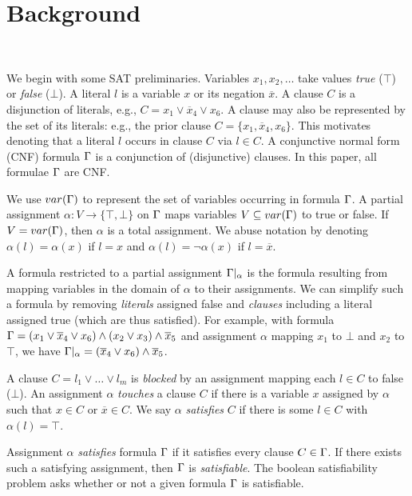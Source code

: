 \section{Background}~\label{sec:background}

We begin with some SAT preliminaries. Variables $x_1, x_2, \dots$ take values
\emph{true} ($\top$) or \emph{false} ($\bot$). A literal $l$ is a variable
$x$ or its negation $\overline{x}$. A clause $C$ is a disjunction of literals,
e.g., $C = x_1 \lor \overline{x}_4 \lor x_6$. A clause may also be represented by the set of its literals:
e.g., the prior clause $C = \{x_1, \overline{x}_4, x_6\}$. This motivates denoting that a literal
$l$ occurs in clause $C$ via $l \in C$. A conjunctive normal form (CNF)
formula $\Gamma$ is a conjunction of (disjunctive) clauses. In this paper,
all formulae $\Gamma$ are CNF.

We use $var(\Gamma)$ to represent the set of variables occurring in formula $\Gamma$.
A partial assignment $\alpha : V \rightarrow \{\top, \bot\}$ on $\Gamma$
maps variables $V \subseteq var(\Gamma)$ to true or false. If $V
= var(\Gamma)$, then $\alpha$ is a total assignment. We abuse notation by
denoting $\alpha(l) = \alpha(x)$ if $l = x$ and $\alpha(l) = \neg \alpha(x)$ if
$l = \overline{x}$.

A formula restricted to a partial assignment $\Gamma|_\alpha$ is the formula resulting from
mapping variables in the domain of $\alpha$ to their assignments. We can
simplify such a formula by removing \emph{literals} assigned false and
\emph{clauses} including a literal assigned true (which are thus satisfied).
For example, with formula $\Gamma =
(x_1 \lor \overline{x}_4 \lor x_6) \land (x_2 \lor x_3) \land \overline{x}_5$
and assignment $\alpha$ mapping $x_1$ to $\bot$ and $x_2$ to $\top$,
we have $\Gamma|_\alpha = (\overline{x}_4 \lor x_6) \land \overline{x}_5$.

A clause $C = l_1 \lor \dots \lor l_m$ is \emph{blocked} by an assignment
mapping each $l \in C$ to false ($\bot$). An assignment $\alpha$
\emph{touches} a clause $C$ if there is a variable $x$ assigned by $\alpha$
such that $x \in C$ or $\overline{x} \in C$. We say $\alpha$ \emph{satisfies}
$C$ if there is some $l \in C$ with $\alpha(l) = \top$.

Assignment $\alpha$ \emph{satisfies} formula $\Gamma$ if it satisfies every
clause $C \in \Gamma$. If there exists such a satisfying assignment, then $\Gamma$ is
\emph{satisfiable}. The boolean satisfiability problem asks whether or not a given
formula $\Gamma$ is satisfiable.

